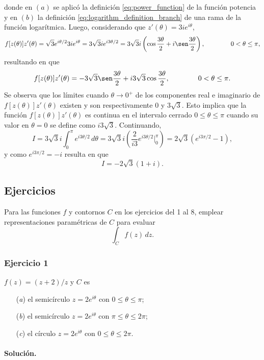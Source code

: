 \documentclass[a4paper]{report}
\begin{document}
donde en \((a)\) se aplicó la definición \ref{eq:power_function} de la función potencia y en \((b)\) la definición \ref{eq:logarithm_definition_branch} de una rama de la función logarítmica. Luego, considerando que \(z'(\theta)=3ie^{i\theta}\),
\[
 f[z(\theta)]z'(\theta)=\sqrt{3}e^{i\theta/2}3ie^{i\theta}=3\sqrt{3}ie^{i3\theta/2}
 =3\sqrt{3}i\left(\cos\frac{3\theta}{2}+i\sen\frac{3\theta}{2}\right),
 \qquad\qquad 0<\theta\leq\pi,
\]
resultando en que 
\[
 f[z(\theta)]z'(\theta)=-3\sqrt{3}\sen\frac{3\theta}{2}+i3\sqrt{3}\cos\frac{3\theta}{2},
 \qquad\qquad 0<\theta\leq\pi.
\]
Se observa que los límites cuando \(\theta\to0^+\) de los componentes real e imaginario de \(f[z(\theta)]z'(\theta)\) existen y son respectivamente \(0\) y \(3\sqrt{3}\). Esto implica que la función \(f[z(\theta)]z'(\theta)\) es continua en el intervalo cerrado \(0\leq\theta\leq\pi\) cuando su valor en \(\theta=0\) se define como \(i3\sqrt{3}\). Continuando,
\[
 I=3\sqrt{3}i\int_0^\pi e^{i3\theta/2}\,d\theta
 =3\sqrt{3}i\left(\frac{2}{i3}e^{i3\theta/2}\bigg|_0^\pi\right)
 =2\sqrt{3}\left(e^{i3\pi/2}-1\right),
\]
y como \(e^{i3\pi/2}=-i\) resulta en que 
\[
 I=-2\sqrt{3}(1+i).
\]


\subsection*{Ejercicios}

Para las funciones \(f\) y contornos \(C\) en los ejercicios del 1 al 8, emplear representaciones paramétricas de \(C\) para evaluar
\[
 \int_C f(z)\,dz.
\]

\subsubsection{Ejercicio 1}

\(f(z)=(z+2)/z\) y \(C\) es
\begin{itemize}
 \item[(\textit{a})] el semicírculo \(z=2e^{i\theta}\) con \(0\leq\theta\leq\pi\);
 \item[(\textit{b})] el semicírculo \(z=2e^{i\theta}\) con \(\pi\leq\theta\leq2\pi\);
 \item[(\textit{c})] el círculo \(z=2e^{i\theta}\) con \(0\leq\theta\leq2\pi\).
\end{itemize}

\paragraph{Solución.}
\end{document}
